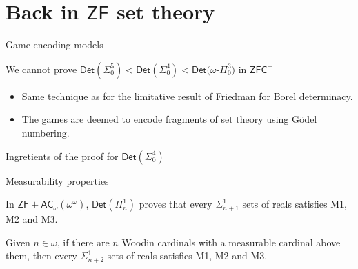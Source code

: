 \documentclass{beamer} %
\begin{document}

\section{Back in \texorpdfstring{$\mathsf{ZF}$}{ZF} set theory}

\begin{frame}{Game encoding models}
    \begin{theorem}
        We cannot prove $\mathsf{Det}(\Sigma_0^5)<\mathsf{Det}(\Sigma_0^4)
        <\mathsf{Det}(\omega$-$\Pi_0^3)$ in $\mathsf{ZFC^-}$ 
    \end{theorem}

    \begin{itemize}
        \item<2-> Same technique as for the limitative result of Friedman for 
            Borel determinacy.
        \item<3-> The games are deemed to encode fragments of set theory using Gödel numbering.
    \end{itemize}
\end{frame}


\begin{frame}{Ingretients of the proof for $\mathsf{Det}(\Sigma_0^4)$}
    
\end{frame}


\begin{frame}{Measurability properties}

    \begin{theorem}
        In $\mathsf{ZF + AC}_{\omega}(\omega^{\omega})$, $\mathsf{Det}(\Pi^1_n)$ proves that 
        every $\Sigma^1_{n+1}$ sets of reals satisfies M1, M2 and M3.
    \end{theorem}

    \begin{theorem}
        Given $n \in \omega$, if there are $n$ Woodin cardinals with a measurable cardinal above 
        them, then every $\Sigma^1_{n+2}$ sets of reals satisfies M1, M2 and M3.
    \end{theorem}
\end{frame}
\end{document}
